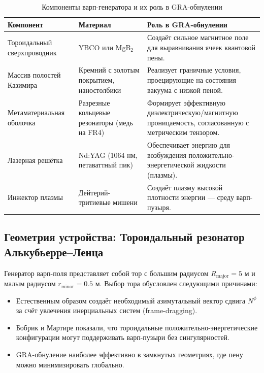 \documentclass[11pt]{article}
\begin{document}
\begin{table}[h]
\centering
\caption{Компоненты варп-генератора и их роль в GRA-обнулении}
\label{tab:components}
\begin{tabular}{@{}lll@{}}
\toprule
\textbf{Компонент} & \textbf{Материал} & \textbf{Роль в GRA-обнулении} \\
\midrule
Тороидальный сверхпроводник & YBCO или MgB$_2$ & Создаёт сильное магнитное поле для выравнивания ячеек квантовой пены. \\
Массив полостей Казимира & Кремний с золотым покрытием, наностолбики & Реализует граничные условия, проецирующие на состояния вакуума с низкой пеной. \\
Метаматериальная оболочка & Разрезные кольцевые резонаторы (медь на FR4) & Формирует эффективную диэлектрическую/магнитную проницаемость, согласованную с метрическим тензором. \\
Лазерная решётка & Nd:YAG (1064 нм, петаваттный пик) & Обеспечивает энергию для возбуждения положительно-энергетической жидкости (плазмы). \\
Инжектор плазмы & Дейтерий-тритиевые мишени & Создаёт плазму высокой плотности энергии — среду варп-пузыря. \\
\bottomrule
\end{tabular}
\end{table}

\subsection{Геометрия устройства: Тороидальный резонатор Алькубьерре--Ленца}

Генератор варп-поля представляет собой тор с большим радиусом $R_{\text{major}} = 5$ м и малым радиусом $r_{\text{minor}} = 0.5$ м. Выбор тора обусловлен следующими причинами:
\begin{itemize}
    \item Естественным образом создаёт необходимый азимутальный вектор сдвига $N^\phi$ за счёт увлечения инерциальных систем (frame-dragging).
    \item Бобрик и Мартире показали, что тороидальные положительно-энергетические конфигурации могут поддерживать варп-пузыри без сингулярностей.
    \item GRA-обнуление наиболее эффективно в замкнутых геометриях, где пену можно минимизировать глобально.
\end{itemize}
\end{document}
